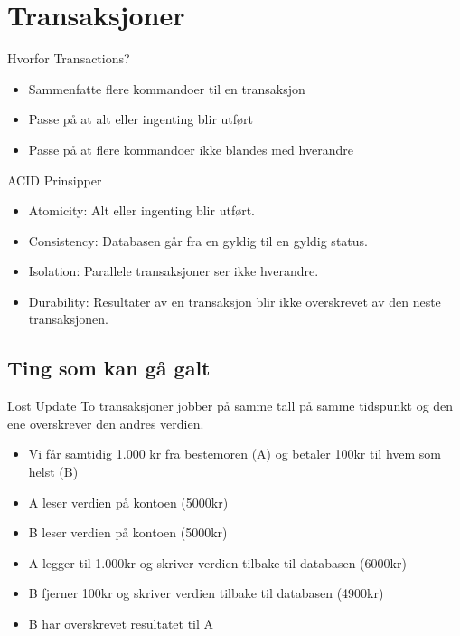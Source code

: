 \section{Transaksjoner}
\begin{frame}{Hvorfor Transactions?}
    \begin{itemize}[<+->]
        \item Sammenfatte flere kommandoer til en transaksjon
        \item Passe på at alt eller ingenting blir utført
        \item Passe på at flere kommandoer ikke blandes med hverandre
    \end{itemize}
\end{frame}

\begin{frame}{ACID Prinsipper}
    \begin{itemize}[<+->]
        \item Atomicity: Alt eller ingenting blir utført.
        \item Consistency: Databasen går fra en gyldig til en gyldig status.
        \item Isolation: Parallele transaksjoner ser ikke hverandre.
        \item Durability: Resultater av en transaksjon blir ikke overskrevet av den neste transaksjonen.
    \end{itemize}
\end{frame}

\subsection*{Ting som kan gå galt}
\begin{frame}{}
    \begin{block}{Lost Update}
    To transaksjoner jobber på samme tall på samme tidspunkt og den ene overskrever den andres verdien.
    \end{block}
    \pause
    \begin{itemize}[<+->]
        \item Vi får samtidig 1.000 kr fra bestemoren (A) og betaler 100kr til hvem som helst (B)
        \item A leser verdien på kontoen (5000kr)
        \item B leser verdien på kontoen (5000kr)
        \item A legger til 1.000kr og skriver verdien tilbake til databasen (6000kr)
        \item B fjerner 100kr og skriver verdien tilbake til databasen (4900kr)
        \item B har overskrevet resultatet til A
    \end{itemize}
    
\end{frame}

